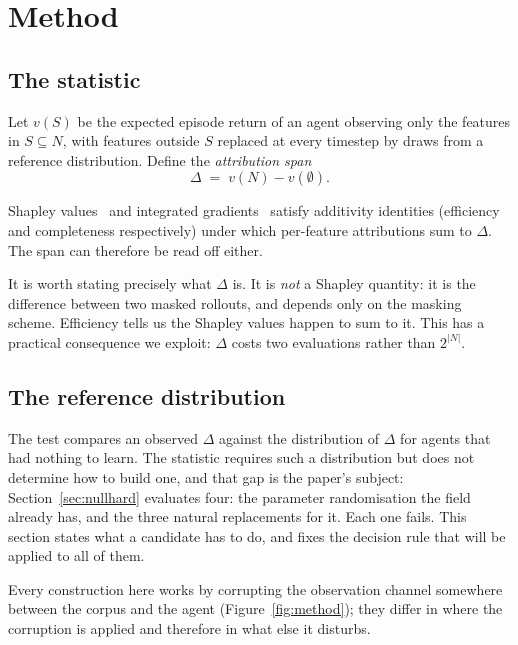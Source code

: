 \documentclass[10pt,twocolumn]{article}
\newcommand{\vfn}{v}
\begin{document}
\section{Method}
\label{sec:method}

\subsection{The statistic}

Let $\vfn(S)$ be the expected episode return of an agent observing only the
features in $S \subseteq N$, with features outside $S$ replaced at every timestep
by draws from a reference distribution. Define the \emph{attribution span}
\begin{equation}
\Delta \;=\; \vfn(N) - \vfn(\emptyset).
\end{equation}

Shapley values~\citep{shapley1953value} and integrated
gradients~\citep{sundararajan2017axiomatic} satisfy additivity identities
(efficiency and completeness respectively) under which per-feature attributions
sum to $\Delta$. The span can therefore be read off either.

It is worth stating precisely what $\Delta$ is. It is \emph{not} a Shapley
quantity: it is the difference between two masked rollouts, and depends only on
the masking scheme. Efficiency tells us the Shapley values happen to sum to it.
This has a practical consequence we exploit: $\Delta$ costs two evaluations
rather than $2^{|N|}$.

\subsection{The reference distribution}
\label{sec:generic}

The test compares an observed $\Delta$ against the distribution of $\Delta$ for
agents that had nothing to learn. The statistic requires such a distribution but
does not determine how to build one, and that gap is the paper's subject:
Section~\ref{sec:nullhard} evaluates four: the parameter randomisation the field
already has, and the three natural replacements for it. Each one fails. This
section states what a candidate has to do, and fixes the decision rule that will
be applied to all of them.

Every construction here works by corrupting the observation channel somewhere
between the corpus and the agent (Figure~\ref{fig:method}); they differ in where
the corruption is applied and therefore in what else it disturbs.
\end{document}
